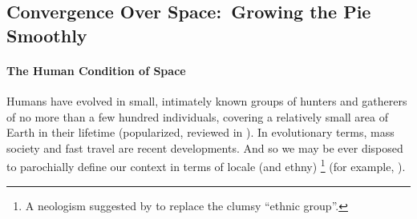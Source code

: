 



\subsection[Convergence Over Space]{Convergence Over Space:\ Growing the Pie Smoothly} \label{sec:space}

\paragraph{The Human Condition of Space} Humans have evolved in small, intimately known groups of hunters and gatherers of no more than a few hundred individuals, covering a relatively small area of Earth in their lifetime (popularized, reviewed in \citealt{Diamond1997}).
In evolutionary terms, mass society and fast travel are recent developments.
And so we may be ever disposed to parochially define our context in terms of locale (and ethny)
\footnote{
	A neologism suggested by \citeauthor{Van-den-Berghe-1981-aa} to replace the clumsy ``ethnic group''.
}
(for example, \citealt{Van-den-Berghe-1981-aa}).

